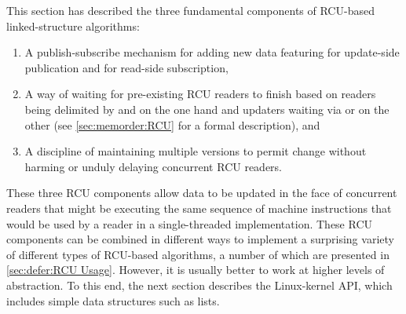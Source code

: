 This section has described the three fundamental components of RCU-based
linked-structure algorithms:

\begin{enumerate}
\item	A publish-subscribe mechanism for adding new data featuring
	 for update-side publication and
	 for read-side subscription,

\item	A way of waiting for pre-existing RCU readers to finish
	based on readers being delimited by 
	and  on the one hand and
	updaters waiting via  or
	 on the other
	(see \cref{sec:memorder:RCU} for a formal description),
	and

\item	A discipline of maintaining multiple versions to permit
	change without harming or unduly delaying concurrent RCU readers.
\end{enumerate}

\QuickQuizEnd

These three RCU components allow data to be updated in the face of concurrent
readers that might be executing the same sequence of machine instructions
that would be used by a reader in a single-threaded implementation.
These RCU components can be combined in different ways to implement a
surprising variety of different types of RCU-based algorithms, a number
of which are presented in
\cref{sec:defer:RCU Usage}.
However, it is usually better to work at higher levels of abstraction.
To this end, the next section describes the Linux-kernel API, which
includes simple data structures such as lists.
